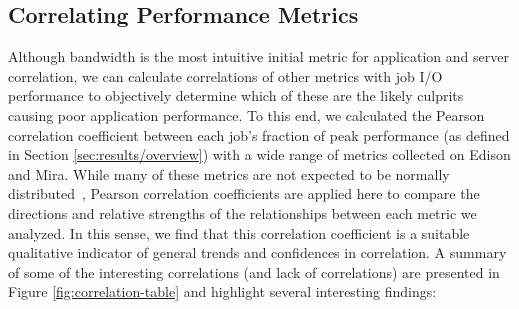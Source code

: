 \subsection{Correlating Performance Metrics} \label{sec:results/correlating}

Although bandwidth is the most intuitive initial metric for application and server
correlation,  
we can calculate correlations of other metrics with job I/O performance to objectively determine which of these are the likely culprits causing poor application performance.
To this end, we calculated the Pearson correlation coefficient between each job's fraction of peak performance (as defined in Section \ref{sec:results/overview}) with a wide range of metrics collected on Edison and Mira.
While many of these metrics are not expected to be normally distributed~\cite{Kim2010}, Pearson correlation coefficients are applied here to compare the directions and relative strengths of the relationships between each metric we analyzed.
In this sense, we find that this correlation coefficient is a suitable qualitative indicator of general trends and confidences in correlation.
A summary of some of the interesting correlations (and lack of correlations) are presented in Figure \ref{fig:correlation-table} and highlight several interesting findings:

